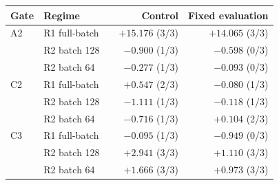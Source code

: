 \begin{tabular}{lllrr}
\toprule
Gate & Regime & & Control & Fixed evaluation \\
\midrule
A2 & R1 full-batch & & $+15.176$ (3/3) & $+14.065$ (3/3) \\
 & R2 batch 128 & & $-0.900$ (1/3) & $-0.598$ (0/3) \\
 & R2 batch 64 & & $-0.277$ (1/3) & $-0.093$ (0/3) \\
\midrule
C2 & R1 full-batch & & $+0.547$ (2/3) & $-0.080$ (1/3) \\
 & R2 batch 128 & & $-1.111$ (1/3) & $-0.118$ (1/3) \\
 & R2 batch 64 & & $-0.716$ (1/3) & $+0.104$ (2/3) \\
\midrule
C3 & R1 full-batch & & $-0.095$ (1/3) & $-0.949$ (0/3) \\
 & R2 batch 128 & & $+2.941$ (3/3) & $+1.110$ (3/3) \\
 & R2 batch 64 & & $+1.666$ (3/3) & $+0.973$ (3/3) \\
\bottomrule
\end{tabular}
